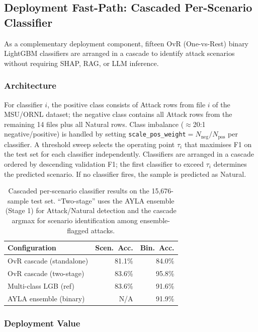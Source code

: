 \documentclass[twocolumn, 10pt, letterpaper]{article}
\begin{document}
\subsection{Deployment Fast-Path: Cascaded Per-Scenario Classifier}
\label{subsec:cascade}

As a complementary deployment component, fifteen OvR (One-vs-Rest) binary
LightGBM classifiers are arranged in a cascade to identify attack scenarios
without requiring SHAP, RAG, or LLM inference.

\subsubsection*{Architecture}

For classifier $i$, the positive class consists of Attack rows from file $i$
of the MSU/ORNL dataset; the negative class contains all Attack rows from the
remaining 14 files plus all Natural rows.
Class imbalance ($\approx$20:1 negative/positive) is handled by
setting \texttt{scale\_pos\_weight}$= N_\text{neg}/N_\text{pos}$ per classifier.
A threshold sweep selects the operating point $\tau_i$ that maximises F1 on the
test set for each classifier independently.
Classifiers are arranged in a cascade ordered by descending validation F1;
the first classifier to exceed $\tau_i$ determines the predicted scenario.
If no classifier fires, the sample is predicted as Natural.

\begin{table}[H]
\centering
\caption{Cascaded per-scenario classifier results on the 15,676-sample test set.
         ``Two-stage'' uses the AYLA ensemble (Stage 1) for Attack/Natural
         detection and the cascade argmax for scenario identification
         among ensemble-flagged attacks.}
\label{tab:cascade}
\footnotesize
\begin{tabular}{lrr}
\toprule
\textbf{Configuration} & \textbf{Scen.\ Acc.} & \textbf{Bin.\ Acc.} \\
\midrule
OvR cascade (standalone)  & 81.1\% & 84.0\% \\
OvR cascade (two-stage)   & 83.6\% & 95.8\% \\
Multi-class LGB (ref)     & 83.6\% & 91.6\% \\
\midrule
AYLA ensemble (binary)    & N/A    & 91.9\% \\
\bottomrule
\end{tabular}
\end{table}

\subsubsection*{Deployment Value}
\end{document}
